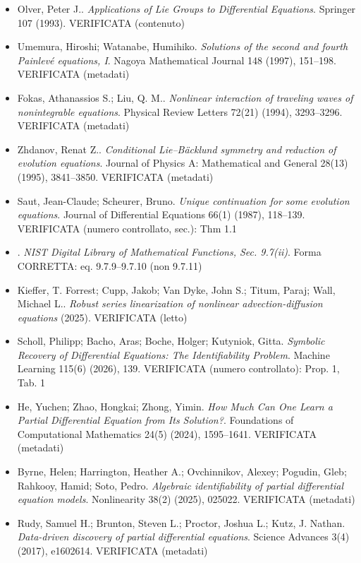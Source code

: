 \begin{itemize}[itemsep=2pt,leftmargin=1.2em,font=\small]
\item Olver, Peter J.. \emph{Applications of Lie Groups to Differential Equations}. Springer 107 (1993). \textsf{\footnotesize VERIFICATA (contenuto)}
\item Umemura, Hiroshi; Watanabe, Humihiko. \emph{Solutions of the second and fourth {P}ainlev{\'e} equations, {I}}. Nagoya Mathematical Journal 148 (1997), 151--198. \textsf{\footnotesize VERIFICATA (metadati)}
\item Fokas, Athanassios S.; Liu, Q. M.. \emph{Nonlinear interaction of traveling waves of nonintegrable equations}. Physical Review Letters 72(21) (1994), 3293--3296. \textsf{\footnotesize VERIFICATA (metadati)}
\item Zhdanov, Renat Z.. \emph{Conditional {L}ie--{B}{\"a}cklund symmetry and reduction of evolution equations}. Journal of Physics A: Mathematical and General 28(13) (1995), 3841--3850. \textsf{\footnotesize VERIFICATA (metadati)}
\item Saut, Jean-Claude; Scheurer, Bruno. \emph{Unique continuation for some evolution equations}. Journal of Differential Equations 66(1) (1987), 118--139. \textsf{\footnotesize VERIFICATA (numero controllato, sec.): Thm 1.1}
\item . \emph{{NIST} Digital Library of Mathematical Functions, Sec. 9.7(ii)}. \textsf{\footnotesize Forma CORRETTA: eq. 9.7.9--9.7.10 (non 9.7.11)}
\item Kieffer, T. Forrest; Cupp, Jakob; Van Dyke, John S.; Titum, Paraj; Wall, Michael L.. \emph{Robust series linearization of nonlinear advection-diffusion equations} (2025). \textsf{\footnotesize VERIFICATA (letto)}
\item Scholl, Philipp; Bacho, Aras; Boche, Holger; Kutyniok, Gitta. \emph{Symbolic Recovery of Differential Equations: The Identifiability Problem}. Machine Learning 115(6) (2026), 139. \textsf{\footnotesize VERIFICATA (numero controllato): Prop. 1, Tab. 1}
\item He, Yuchen; Zhao, Hongkai; Zhong, Yimin. \emph{How Much Can One Learn a Partial Differential Equation from Its Solution?}. Foundations of Computational Mathematics 24(5) (2024), 1595--1641. \textsf{\footnotesize VERIFICATA (metadati)}
\item Byrne, Helen; Harrington, Heather A.; Ovchinnikov, Alexey; Pogudin, Gleb; Rahkooy, Hamid; Soto, Pedro. \emph{Algebraic identifiability of partial differential equation models}. Nonlinearity 38(2) (2025), 025022. \textsf{\footnotesize VERIFICATA (metadati)}
\item Rudy, Samuel H.; Brunton, Steven L.; Proctor, Joshua L.; Kutz, J. Nathan. \emph{Data-driven discovery of partial differential equations}. Science Advances 3(4) (2017), e1602614. \textsf{\footnotesize VERIFICATA (metadati)}

\end{itemize}
